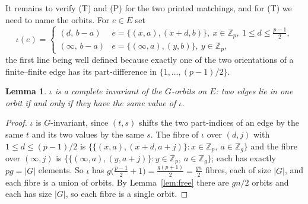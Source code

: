 \documentclass[11pt]{amsart}
\newtheorem{lemma}[theorem]{Lemma}
\theoremstyle{remark}
\newcommand{\Zp}{\mathbb Z}
\begin{document}
It remains to verify (T) and (P) for the two printed matchings, and for (T) we
need to name the orbits. For $e\in E$ set
\begin{equation}\label{eq:inv}
 \iota(e)=
 \begin{cases}
 (d,\,b-a) & e=\{(x,a),(x+d,b)\},\ x\in\Zp_p,\ 1\le d\le\tfrac{p-1}2,\\[2pt]
 (\infty,\,b-a) & e=\{(\infty,a),(y,b)\},\ y\in\Zp_p ,
 \end{cases}
\end{equation}
the first line being well defined because exactly one of the two orientations
of a finite--finite edge has its part-difference in $\{1,\dots,(p-1)/2\}$.

\begin{lemma}\label{lem:inv}
$\iota$ is a complete invariant of the $G$-orbits on $E$: two edges lie in one
orbit if and only if they have the same value of $\iota$.
\end{lemma}

\begin{proof}
$\iota$ is $G$-invariant, since $(t,s)$ shifts the two part-indices of an edge
by the same $t$ and its two values by the same $s$. The fibre of $\iota$ over
$(d,j)$ with $1\le d\le(p-1)/2$ is
$\{\{(x,a),(x+d,a+j)\}: x\in\Zp_p,\ a\in\Zp_g\}$ and the fibre over
$(\infty,j)$ is $\{\{(\infty,a),(y,a+j)\}: y\in\Zp_p,\ a\in\Zp_g\}$; each has
exactly $pg=|G|$ elements. So $\iota$ has
$g\bigl(\frac{p-1}2+1\bigr)=\frac{g(p+1)}2=\frac{gn}2$ fibres, each of size
$|G|$, and each fibre is a union of orbits. By Lemma~\ref{lem:free} there are
$gn/2$ orbits and each has size $|G|$, so each fibre is a single orbit.
\end{proof}
\end{document}
